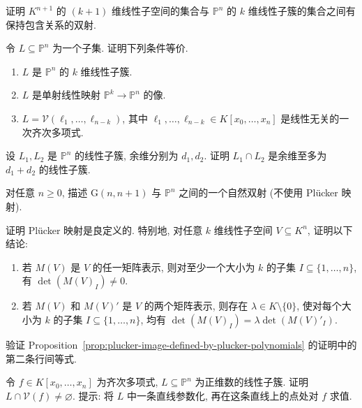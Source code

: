 \BookExerciseHeading
\begin{BookExercises}
  \item\label{ex:linear-projective-subvarieties-correspond-to-vector-subspaces} 证明 $K^{n+1}$ 的 $(k+1)$ 维线性子空间的集合与 $\mathbb{P}^{n}$ 的 $k$ 维线性子簇的集合之间有保持包含关系的双射.
  \item\label{ex:characterize-linear-projective-subvarieties} 令 $L\subseteq\mathbb{P}^{n}$ 为一个子集. 证明下列条件等价.
  \begin{enumerate}[label=(\roman*)]
    \item $L$ 是 $\mathbb{P}^{n}$ 的 $k$ 维线性子簇.
    \item $L$ 是单射线性映射 $\mathbb{P}^{k}\to\mathbb{P}^{n}$ 的像.
    \item $L=\mathcal{V}(\ell_{1},\ldots,\ell_{n-k})$, 其中 $\ell_{1},\ldots,\ell_{n-k}\in K[x_{0},\ldots,x_{n}]$ 是线性无关的一次齐次多项式.
  \end{enumerate}
  \item\label{ex:codimension-of-linear-subvariety-intersection} 设 $L_{1},L_{2}$ 是 $\mathbb{P}^{n}$ 的线性子簇, 余维分别为 $d_{1},d_{2}$. 证明 $L_{1}\cap L_{2}$ 是余维至多为 $d_{1}+d_{2}$ 的线性子簇.
  \item\label{ex:grassmannian-of-hyperplanes-and-projective-space} 对任意 $n\ge0$, 描述 $\mathrm{G}(n,n+1)$ 与 $\mathbb{P}^{n}$ 之间的一个自然双射 (不使用 Plücker 映射).
  \item\label{ex:plucker-map-well-defined} 证明 Plücker 映射是良定义的. 特别地, 对任意 $k$ 维线性子空间 $V\subseteq K^{n}$, 证明以下结论:
  \begin{enumerate}
    \item 若 $M(V)$ 是 $V$ 的任一矩阵表示, 则对至少一个大小为 $k$ 的子集 $I\subseteq\{1,\ldots,n\}$, 有 $\det(M(V)_{I})\ne0$.
    \item 若 $M(V)$ 和 $M(V)'$ 是 $V$ 的两个矩阵表示, 则存在 $\lambda\in K\setminus\{0\}$, 使对每个大小为 $k$ 的子集 $I\subseteq\{1,\ldots,n\}$, 均有 $\det(M(V)_{I})=\lambda\det(M(V)'_{I})$.
  \end{enumerate}
  \item\label{ex:determinant-expansions-for-plucker-equations} 验证 Proposition~\ref{prop:plucker-image-defined-by-plucker-polynomials} 的证明中的第二条行间等式.
  \item\label{ex:positive-dimensional-linear-subvariety-meets-hypersurface} 令 $f\in K[x_{0},\ldots,x_{n}]$ 为齐次多项式, $L\subseteq\mathbb{P}^{n}$ 为正维数的线性子簇. 证明 $L\cap\mathcal{V}(f)\ne\varnothing$. 提示: 将 $L$ 中一条直线参数化, 再在这条直线上的点处对 $f$ 求值.

\end{BookExercises}

